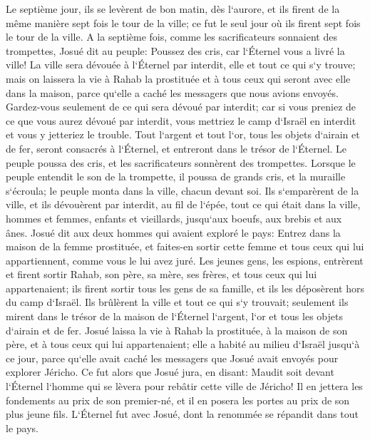\verse Le septième jour, ils se levèrent de bon matin, dès l`aurore, et ils firent de la même manière sept fois le tour de la ville; ce fut le seul jour où ils firent sept fois le tour de la ville. 
\verse A la septième fois, comme les sacrificateurs sonnaient des trompettes, Josué dit au peuple: Poussez des cris, car l`Éternel vous a livré la ville! 
\verse La ville sera dévouée à l`Éternel par interdit, elle et tout ce qui s`y trouve; mais on laissera la vie à Rahab la prostituée et à tous ceux qui seront avec elle dans la maison, parce qu`elle a caché les messagers que nous avions envoyés. 
\verse Gardez-vous seulement de ce qui sera dévoué par interdit; car si vous preniez de ce que vous aurez dévoué par interdit, vous mettriez le camp d`Israël en interdit et vous y jetteriez le trouble. 
\verse Tout l`argent et tout l`or, tous les objets d`airain et de fer, seront consacrés à l`Éternel, et entreront dans le trésor de l`Éternel. 
\verse Le peuple poussa des cris, et les sacrificateurs sonnèrent des trompettes. Lorsque le peuple entendit le son de la trompette, il poussa de grands cris, et la muraille s`écroula; le peuple monta dans la ville, chacun devant soi. Ils s`emparèrent de la ville, 
\verse et ils dévouèrent par interdit, au fil de l`épée, tout ce qui était dans la ville, hommes et femmes, enfants et vieillards, jusqu`aux boeufs, aux brebis et aux ânes. 
\verse Josué dit aux deux hommes qui avaient exploré le pays: Entrez dans la maison de la femme prostituée, et faites-en sortir cette femme et tous ceux qui lui appartiennent, comme vous le lui avez juré. 
\verse Les jeunes gens, les espions, entrèrent et firent sortir Rahab, son père, sa mère, ses frères, et tous ceux qui lui appartenaient; ils firent sortir tous les gens de sa famille, et ils les déposèrent hors du camp d`Israël. 
\verse Ils brûlèrent la ville et tout ce qui s`y trouvait; seulement ils mirent dans le trésor de la maison de l`Éternel l`argent, l`or et tous les objets d`airain et de fer. 
\verse Josué laissa la vie à Rahab la prostituée, à la maison de son père, et à tous ceux qui lui appartenaient; elle a habité au milieu d`Israël jusqu`à ce jour, parce qu`elle avait caché les messagers que Josué avait envoyés pour explorer Jéricho. 
\verse Ce fut alors que Josué jura, en disant: Maudit soit devant l`Éternel l`homme qui se lèvera pour rebâtir cette ville de Jéricho! Il en jettera les fondements au prix de son premier-né, et il en posera les portes au prix de son plus jeune fils. 
\verse L`Éternel fut avec Josué, dont la renommée se répandit dans tout le pays. 

